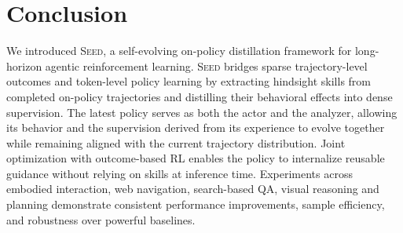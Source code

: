 \section{Conclusion}
We introduced \textsc{Seed}, a self-evolving on-policy distillation framework for long-horizon agentic reinforcement learning. \textsc{Seed} bridges sparse trajectory-level outcomes and token-level policy learning by extracting hindsight skills from completed on-policy trajectories and distilling their behavioral effects into dense supervision. The latest policy serves as both the actor and the analyzer, allowing its behavior and the supervision derived from its experience to evolve together while remaining aligned with the current trajectory distribution. Joint optimization with outcome-based RL enables the policy to internalize reusable guidance without relying on skills at inference time. Experiments across embodied interaction, web navigation, search-based QA, visual reasoning and planning demonstrate consistent performance improvements, sample efficiency, and robustness over powerful baselines.
